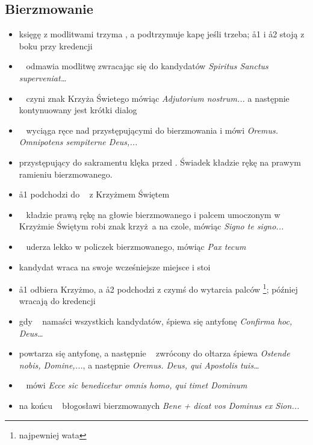 \subsection{Bierzmowanie}
\label{sec:bierz}
\begin{itemize}
      \item księgę z modlitwami trzyma , a  podtrzymuje kapę jeśli
            trzeba; \aa1 i \aa2 stoją z boku przy kredencji
      \item \ii~ odmawia modlitwę zwracając się do kandydatów \textit{Spiritus
                  Sanctus superveniat\dots}
      \item \ii~ czyni znak Krzyża Świetego mówiąc \textit{Adjutorium
                  nostrum...} a następnie kontynuowany jest krótki dialog
      \item \ii~ wyciąga ręce nad przystępującymi do bierzmowania i mówi
            \textit{Oremus. Omnipotens sempiterne Deus,...}
      \item przystępujący do sakramentu klęka przed \ii. Świadek kładzie rękę na
            prawym ramieniu bierzmowanego.
      \item \aa1 podchodzi do \ii~ z Krzyżmem Świętem
      \item \ii~ kładzie prawą rękę na głowie bierzmowanego i palcem umoczonym w
            Krzyżmie Świętym robi znak krzyż a na czole, mówiąc \textit{Signo te
                  signo...}
      \item \ii~ uderza lekko w policzek bierzmowanego, mówiąc \textit{Pax tecum}
      \item kandydat wraca na swoje wcześniejsze miejsce i stoi
      \item \aa1 odbiera Krzyżmo, a \aa2 podchodzi z czymś do wytarcia palców
            \footnote{najpewniej wata}; później wracają do kredencji
      \item gdy \ii~ namaści wszystkich kandydatów, śpiewa się antyfonę
            \textit{Confirma hoc, Deus\dots}
      \item powtarza się antyfonę, a następnie \ii~ zwrócony do ołtarza śpiewa
            \textit{Ostende nobis, Domine,...}, a następnie \textit{Oremus.
                  Deus, qui Apostolis tuis\dots}
      \item \ii~ mówi \textit{Ecce sic benedicetur omnis homo, qui timet Dominum}
      \item na końcu \ii~ błogosławi bierzmowanych
            \textit{Bene + dicat vos Dominus ex Sion...}
\end{itemize}